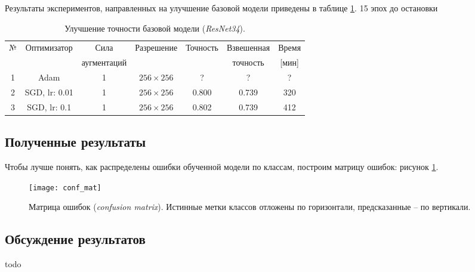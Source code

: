 Результаты экспериментов, направленных на улучшение базовой модели
приведены в таблице \ref{tabular: train_tricks}. 15 эпох до остановки


\begin{table}[h]
    \begin{center}
        \begin{tabular}{c | c| c | c | c| c| c}
            \hline
            № & Оптимизатор & Сила & Разрешение & Точность & Взвешенная  & Время \\
            & & аугментаций & & & точность & [мин] \\
            \hline
    
           1 & Adam & 1 & $256 \times 256$ & ? & ? & ? \\
           
           2 & SGD, lr: 0.01 & 1 & $256 \times 256 $ & 0.800 & 0.739 & 320 \\
           
           3 & SGD, lr: 0.1 & 1 & $256 \times 256 $ & 0.802 & 0.739 & 412 \\
               
            \hline
        \end{tabular}
    \end{center}
    \caption{Улучшение точности базовой модели (\textit{ResNet34}).}
    \label{tabular: train_tricks}
\end{table}



\subsection{Полученные результаты}

\indent
\indent
Чтобы лучше понять, как распределены ошибки обученной модели по классам,
построим матрицу ошибок: рисунок \ref{tikzpicture: conf_mat}.

\begin{figure}[h!]
    \begin{center}
   	    \texttt{[image: conf\_mat]}
   	\end{center}
   	\caption{Матрица ошибок (\textit{confusion matrix}). Истинные метки 
   	               классов отложены по горизонтали, предсказанные -- по вертикали.}
   	\label{tikzpicture: conf_mat}
\end{figure}


\indent
\indent




\subsection{Обсуждение результатов}
todo
